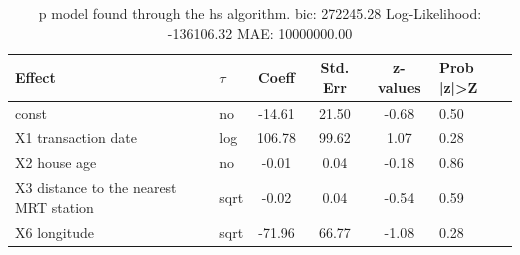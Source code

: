 \begin{table}
	\caption{p model found through the hs algorithm. bic: 272245.28 Log-Likelihood: -136106.32 MAE: 10000000.00}
	\begin{center}
		\begin{tabular}{|l|l|c|c|c|l|}
			\hline
			Effect & $\tau$ & Coeff & Std. Err & z-values & Prob |z|>Z \\
			\hline
			const & no & -14.61 & 21.50 & -0.68 & 0.50 \\
			\hline
			X1 transaction date & log & 106.78 & 99.62 & 1.07 & 0.28 \\
			\hline
			X2 house age & no & -0.01 & 0.04 & -0.18 & 0.86 \\
			\hline
			X3 distance to the nearest MRT station & sqrt & -0.02 & 0.04 & -0.54 & 0.59 \\
			\hline
			X6 longitude & sqrt & -71.96 & 66.77 & -1.08 & 0.28 \\
			\hline
		\end{tabular}
	\end{center}
\end{table}